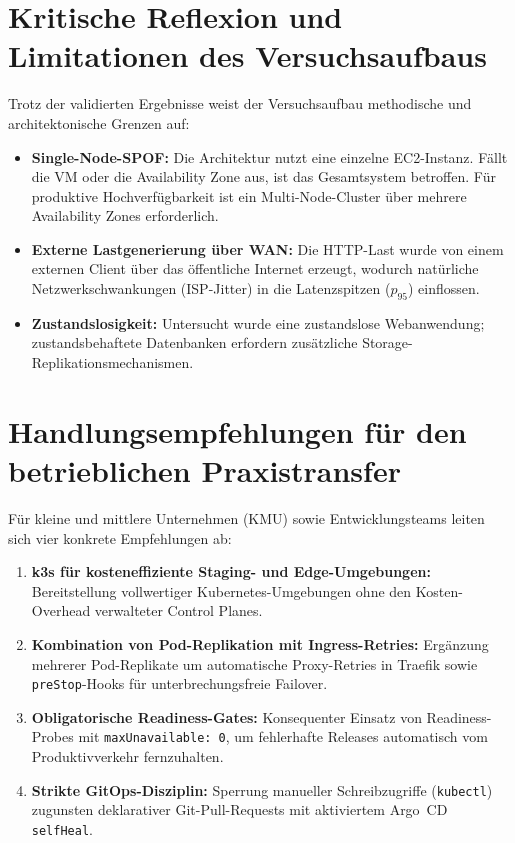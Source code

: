 \section{Kritische Reflexion und Limitationen des Versuchsaufbaus}
\label{sec:einschraenkungen-grenzen}
Trotz der validierten Ergebnisse weist der Versuchsaufbau methodische und architektonische Grenzen auf:
\begin{itemize}[noitemsep,topsep=2pt]
    \item \textbf{Single-Node-SPOF:} Die Architektur nutzt eine einzelne EC2-Instanz. Fällt die VM oder die Availability Zone aus, ist das Gesamtsystem betroffen. Für produktive Hochverfügbarkeit ist ein Multi-Node-Cluster über mehrere Availability Zones erforderlich.
    \item \textbf{Externe Lastgenerierung über WAN:} Die HTTP-Last wurde von einem externen Client über das öffentliche Internet erzeugt, wodurch natürliche Netzwerkschwankungen (ISP-Jitter) in die Latenzspitzen ($p_{95}$) einflossen.
    \item \textbf{Zustandslosigkeit:} Untersucht wurde eine zustandslose Webanwendung; zustandsbehaftete Datenbanken erfordern zusätzliche Storage-Replikationsmechanismen.
\end{itemize}

\section{Handlungsempfehlungen für den betrieblichen Praxistransfer}
\label{sec:praxistransfer-nutzen}
Für kleine und mittlere Unternehmen (KMU) sowie Entwicklungsteams leiten sich vier konkrete Empfehlungen ab:
\begin{enumerate}[noitemsep,topsep=2pt]
    \item \textbf{k3s für kosteneffiziente Staging- und Edge-Umgebungen:} Bereitstellung vollwertiger Kubernetes-Umgebungen ohne den Kosten-Overhead verwalteter Control Planes.
    \item \textbf{Kombination von Pod-Replikation mit Ingress-Retries:} Ergänzung mehrerer Pod-Replikate um automatische Proxy-Retries in Traefik sowie \texttt{preStop}-Hooks für unterbrechungsfreie Failover.
    \item \textbf{Obligatorische Readiness-Gates:} Konsequenter Einsatz von Readiness-Probes mit \texttt{maxUnavailable: 0}, um fehlerhafte Releases automatisch vom Produktivverkehr fernzuhalten.
    \item \textbf{Strikte GitOps-Disziplin:} Sperrung manueller Schreibzugriffe (\texttt{kubectl}) zugunsten deklarativer Git-Pull-Requests mit aktiviertem Argo~CD \texttt{selfHeal}.
\end{enumerate}
